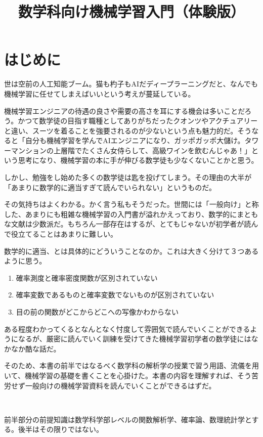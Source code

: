 \documentclass[dvipdfmx, a4paper]{jsarticle}
\title{数学科向け機械学習入門（体験版）}
\author{}
\begin{document}
\maketitle

\section{はじめに}
世は空前の人工知能ブーム。猫も杓子もAIだディープラーニングだと、なんでも機械学習に任せてしまえばいいという考えが蔓延している。

機械学習エンジニアの待遇の良さや需要の高さを耳にする機会は多いことだろう。かつて数学徒の目指す職種としてありがちだったクオンツやアクチュアリーと違い、スーツを着ることを強要されるのが少ないという点も魅力的だ。そうなると「自分も機械学習を学んでAIエンジニアになり、ガッポガッポ大儲け。タワーマンションの上層階でたくさん女侍らして、高級ワインを飲むんじゃあ！」という思考になり、機械学習の本に手が伸びる数学徒も少なくないことかと思う。

しかし、勉強をし始めた多くの数学徒は匙を投げてしまう。その理由の大半が「あまりに数学的に適当すぎて読んでいられない」というものだ。

その気持ちはよくわかる。かく言う私もそうだった。世間には「一般向け」と称した、あまりにも粗雑な機械学習の入門書が溢れかえっており、数学的にまともな文献は少数派だ。もちろん一部存在はするが、とてもじゃないが初学者が読んで役立てることはあまりに難しい。

数学的に適当、とは具体的にどういうことなのか。これは大きく分けて３つあるように思う。

\begin{enumerate}
\item 確率測度と確率密度関数が区別されていない
\item 確率変数であるものと確率変数でないものが区別されていない
\item 目の前の関数がどこからどこへの写像かわからない
\end{enumerate}

ある程度わかってくるとなんとなく忖度して雰囲気で読んでいくことができるようになるが、厳密に読んでいく訓練を受けてきた機械学習初学者の数学徒にはなかなか酷な話だ。

そのため、本書の前半ではなるべく数学科の解析学の授業で習う用語、流儀を用いて、機械学習の基礎を書くことを心掛けた。本書の内容を理解すれば、そう苦労せず一般向けの機械学習資料を読んでいくことができるはずだ。

　

前半部分の前提知識は数学科学部レベルの関数解析学、確率論、数理統計学とする。後半はその限りではない。
\end{document}
